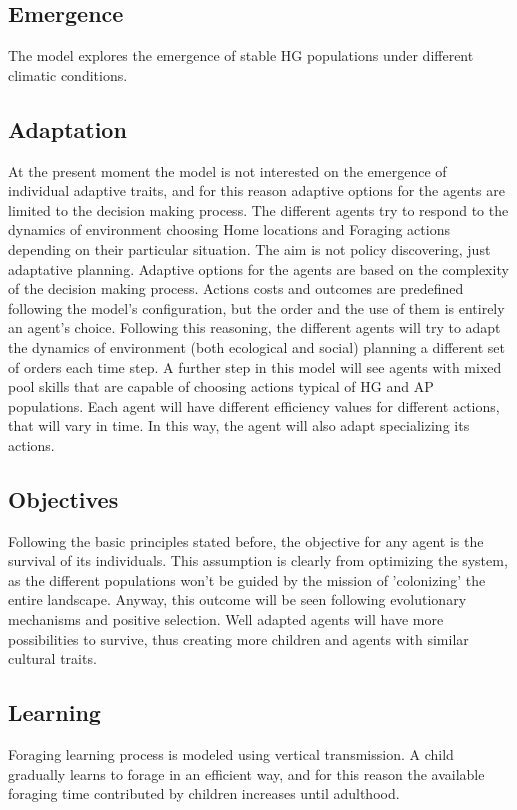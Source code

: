 \documentclass[11pt,oneside,a4paper,openright]{report}
\begin{document}
\subsection{Emergence}
The model explores the emergence of stable HG populations under different climatic conditions.

\subsection{Adaptation}
At the present moment the model is not interested on the emergence of individual adaptive traits, and
for this reason adaptive options for the agents are limited to the decision making process. The different
agents try to respond to the dynamics of environment choosing Home locations and Foraging actions
depending on their particular situation. The aim is not policy discovering, just adaptative planning.
Adaptive options for the agents are based on the complexity of the decision making process. Actions
costs and outcomes are predefined following the model's configuration, but the order and the use of
them is entirely an agent's choice. Following this reasoning, the different agents will try to adapt the
dynamics of environment (both ecological and social) planning a different set of orders each time step.
A further step in this model will see agents with mixed pool skills that are capable of choosing actions typical of HG and AP populations. Each agent will have different efficiency values for different actions, that will vary in time. In this way, the agent will also adapt specializing its actions.


\subsection{Objectives}
Following the basic principles stated before, the objective for any agent is the survival of its individuals.
This assumption is clearly from optimizing the system, as the different populations won't be guided by
the mission of 'colonizing' the entire landscape. Anyway, this outcome will be seen following
evolutionary mechanisms and positive selection. Well adapted agents will have more possibilities to
survive, thus creating more children and agents with similar cultural traits.

\subsection{Learning}
Foraging learning process is modeled using vertical transmission. A child gradually learns to forage in
an efficient way, and for this reason the available foraging time contributed by children increases until
adulthood.
\end{document}
